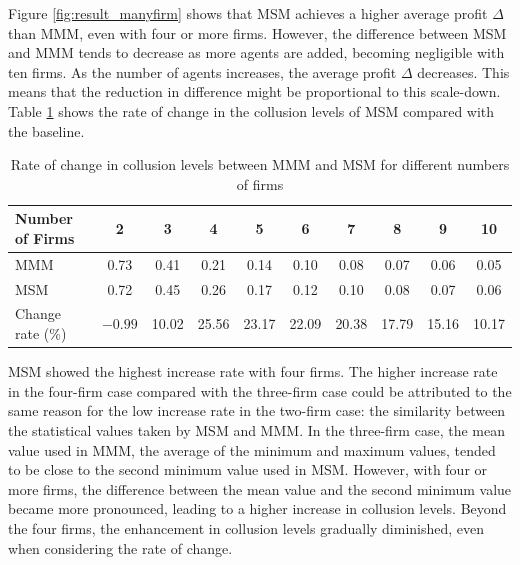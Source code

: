 \documentclass[runningheads]{llncs}
\begin{document}
    Figure \ref{fig:result_manyfirm} shows that MSM achieves a higher average profit $\Delta$ than MMM, even with four or more firms.
    However, the difference between MSM and MMM tends to decrease as more agents are added, becoming negligible with ten firms.
    As the number of agents increases, the average profit $\Delta$ decreases. This means that the reduction in difference might be proportional to this scale-down.
    Table \ref{tab:change_rate} shows the rate of change in the collusion levels of MSM compared with the baseline.
    
    \begin{table}[tb]
    \small
    \centering
    \caption{Rate of change in collusion levels between MMM and MSM for different numbers of firms}
    \label{tab:change_rate}
    \begin{tabular}{|p{3cm}|*{9}{c|}}
        \hline
        Number of Firms & 2 & 3 & 4 & 5 & 6 & 7 & 8 & 9 & 10 \\
        \hline
        MMM & 0.73 & 0.41 & 0.21 & 0.14 & 0.10 & 0.08 & 0.07 & 0.06 & 0.05 \\
        MSM & 0.72 & 0.45 & 0.26 & 0.17 & 0.12 & 0.10 & 0.08 & 0.07 & 0.06 \\
        Change rate (\%) & $-0.99$ & 10.02 & 25.56 & 23.17 & 22.09 & 20.38 & 17.79 & 15.16 & 10.17 \\
        \hline
    \end{tabular}
    \end{table}
        
    MSM showed the highest increase rate with four firms.
    The higher increase rate in the four-firm case compared with the three-firm case could be attributed to the same reason for the low increase rate in the two-firm case: the similarity between the statistical values taken by MSM and MMM.
    In the three-firm case, the mean value used in MMM, the average of the minimum and maximum values, tended to be close to the second minimum value used in MSM.
    However, with four or more firms, the difference between the mean value and the second minimum value became more pronounced, leading to a higher increase in collusion levels.
    Beyond the four firms, the enhancement in collusion levels gradually diminished, even when considering the rate of change.
\end{document}
